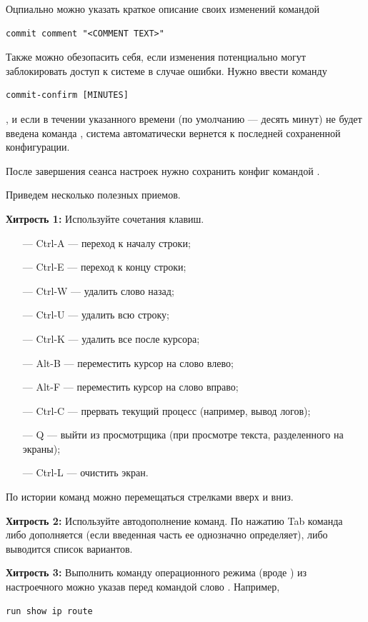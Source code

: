 \documentclass[a4paper,12pt, twoside, russian]{report}
\begin{document}
Оцпиально можно указать краткое описание своих изменений командой
\begin{verbatim}
commit comment "<COMMENT TEXT>"
\end{verbatim}

Также можно обезопасить себя, если изменения потенциально могут заблокировать доступ к системе в случае
ошибки. Нужно ввести команду 
\begin{verbatim}commit-confirm [MINUTES]\end{verbatim}, и если в течении указанного времени 
(по умолчанию --- десять минут) не будет введена команда , система автоматически вернется
к последней сохраненной конфигурации.
\par\noindent После завершения сеанса настроек нужно сохранить конфиг командой . \\
\par\noindent Приведем несколько полезных приемов. \\

\par\noindent \textbf{Хитрость 1:} Используйте сочетания клавиш.
\begin{itemize}
 \item[---] Ctrl-A --- переход к началу строки;
 \item[---] Ctrl-E --- переход к концу строки;
 \item[---] Ctrl-W --- удалить слово назад;
 \item[---] Ctrl-U --- удалить всю строку;
 \item[---] Ctrl-K --- удалить все после курсора;
 \item[---] Alt-B --- переместить курсор на слово влево;
 \item[---] Alt-F --- переместить курсор на слово вправо;
 \item[---] Ctrl-C --- прервать текущий процесс (например, вывод логов);
 \item[---] Q --- выйти из просмотрщика (при просмотре текста, разделенного на экраны);
 \item[---] Ctrl-L --- очистить экран.
\end{itemize}
По истории команд можно перемещаться стрелками вверх и вниз.


\par\noindent \textbf{Хитрость 2:} Используйте автодополнение команд. По нажатию Tab команда либо дополняется 
(если введенная часть ее однозначно определяет), либо выводится список вариантов.


\par\noindent \textbf{Хитрость 3:} Выполнить команду операционного режима (вроде ) 
из настроечного можно указав перед командой слово . Например, 
\begin{verbatim}run show ip route\end{verbatim}
\end{document}
